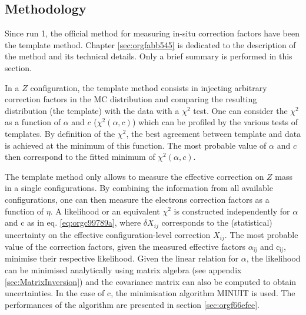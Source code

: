 \subsection{Methodology}
Since run 1, the official method for measuring in-situ correction factors have been the template method.
Chapter \ref{sec:orgfabb545} is dedicated to the description of the method and its technical details.
Only a brief summary is performed in this section.

In a $Z$ configuration, the template method consists in injecting arbitrary correction factors in the MC distribution and comparing the resulting distribution (the template) with the data with a $\chi^2$ test.
One can consider the $\chi^2$ as a function of $\alpha$ and $c$ ($\chi^2(\alpha, c)$) which can be profiled by the various tests of templates.
By definition of the $\chi^2$, the best agreement between template and data is achieved at the minimum of this function.
The most probable value of $\alpha$ and $c$  then correspond to the fitted minimum of $\chi^2(\alpha, c)$.

The template method only allows to measure the effective correction on $Z$ mass in a single configurations.
By combining the information from all available configurations, one can then measure the electrons correction factors as a function of $\eta$.
A likelihood or an equivalent $\chi^2$ is constructed independently for \(\alpha\) and c as in eq. \ref{eq:orgc99789a}, where $\delta X_{ij}$ corresponds to the (statistical) uncertainty on the effective configuration-level correction $X_{ij}$.
The most probable value of the correction factors, given the measured effective factors \(\alpha_{\text{ij}}\) and c\(_{\text{ij}}\), minimise their respective likelihood.
Given the linear relation for \(\alpha\), the likelihood can be minimised analytically using matrix algebra (see appendix \ref{sec:MatrixInversion}) and the covariance matrix can also be computed to obtain uncertainties.
In the case of c, the minimisation algorithm MINUIT \cite{James:873119} is used.
The performances of the algorithm are presented in section \ref{sec:orgf66efee}.

